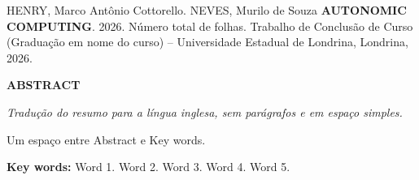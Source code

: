 \noindent HENRY, Marco Antônio Cottorello. NEVES, Murilo de Souza
\textbf{AUTONOMIC COMPUTING}. 2026. Número total de folhas. Trabalho de
Conclusão de Curso (Graduação em nome do curso) -- Universidade
Estadual de Londrina, Londrina, 2026.

\vspace{2\baselineskip}
\begin{center}
  \textbf{ABSTRACT}
\end{center}

\vspace{\baselineskip}

\noindent \textit{Tradução do resumo para a língua inglesa, sem
parágrafos e em espaço simples.}

\vfill

\noindent Um espaço entre Abstract e Key words.

\noindent\textbf{Key words:} Word 1. Word 2. Word 3. Word 4. Word 5.
